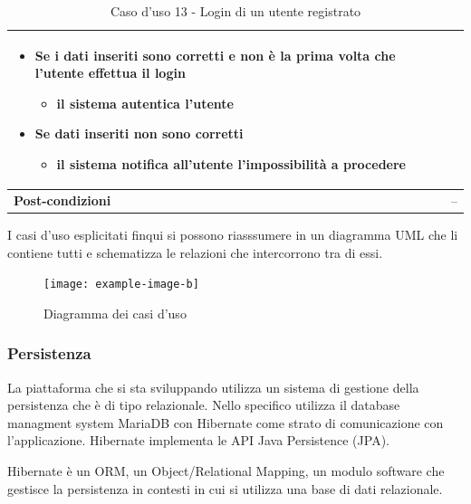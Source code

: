 \documentclass[a4paper,11pt]{article}
\begin{document}
\begin{table}[H]
\begin{tabular}{|m{2cm}|m{10.5cm}|}
\begin{itemize}
\begin{itemize}
\begin{itemize}
                    \end{itemize}
              \item Se i dati inseriti sono corretti e non è la prima volta che l'utente effettua il login
                    \begin{itemize}
                      \item il sistema autentica l'utente
                    \end{itemize}
              \item Se dati inseriti non sono corretti
                    \begin{itemize}
                      \item il sistema notifica all'utente l'impossibilità a procedere
                    \end{itemize}
            \end{itemize}
    \end{itemize}                                \\ \hline
    \multicolumn{1}{|l|}{\textbf{Post-condizioni}} & --                                                  \\ \hline
  \end{tabular}
  \caption{Caso d'uso 13 - Login di un utente registrato}
  \label{cu:CU13}
\end{table}

I casi d'uso esplicitati finqui si possono riasssumere in un diagramma UML che li contiene tutti e schematizza le relazioni che intercorrono tra di essi.

\begin{figure}[H]
  \texttt{[image: example-image-b]}
  \caption{Diagramma dei casi d'uso}
  \label{fig:diagrammacasi}
\end{figure}


\subsubsection{Persistenza}

La piattaforma che si sta sviluppando utilizza un sistema di gestione della persistenza che è di tipo relazionale. Nello specifico utilizza il database managment system MariaDB con Hibernate come strato di comunicazione con l'applicazione. Hibernate implementa le API Java Persistence (JPA).

Hibernate è un ORM, un Object/Relational Mapping, un modulo software che gestisce la persistenza in contesti in cui si utilizza una base di dati relazionale.
\end{document}
